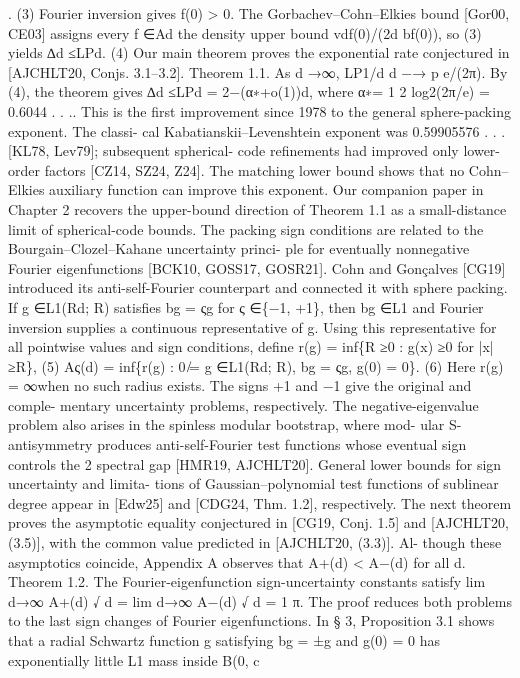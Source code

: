 .
(3)
Fourier inversion gives f(0) > 0. The Gorbachev–Cohn–Elkies bound [Gor00, CE03] assigns
every f ∈Ad the density upper bound vdf(0)/(2d bf(0)), so (3) yields
∆d ≤LPd.
(4)
Our main theorem proves the exponential rate conjectured in [AJCHLT20, Conjs. 3.1–3.2].
Theorem 1.1. As d →∞, LP1/d
d
−→
p
e/(2π).
By (4), the theorem gives ∆d ≤LPd = 2−(α∗+o(1))d, where α∗= 1
2 log2(2π/e) = 0.6044 . . ..
This is the ﬁrst improvement since 1978 to the general sphere-packing exponent. The classi-
cal Kabatianskii–Levenshtein exponent was 0.59905576 . . . [KL78, Lev79]; subsequent spherical-
code reﬁnements had improved only lower-order factors [CZ14, SZ24, Z24]. The matching lower
bound shows that no Cohn–Elkies auxiliary function can improve this exponent.
Our companion paper in Chapter 2 recovers the upper-bound direction of Theorem 1.1 as a
small-distance limit of spherical-code bounds.
The packing sign conditions are related to the Bourgain–Clozel–Kahane uncertainty princi-
ple for eventually nonnegative Fourier eigenfunctions [BCK10, GOSS17, GOSR21]. Cohn and
Gonçalves [CG19] introduced its anti-self-Fourier counterpart and connected it with sphere
packing. If g ∈L1(Rd; R) satisﬁes bg = ςg for ς ∈\{−1, +1\}, then bg ∈L1 and Fourier inversion
supplies a continuous representative of g. Using this representative for all pointwise values and
sign conditions, deﬁne
r(g) = inf\{R ≥0 : g(x) ≥0 for |x| ≥R\},
(5)
Aς(d) = inf\{r(g) : 0 ̸= g ∈L1(Rd; R), bg = ςg, g(0) = 0\}.
(6)
Here r(g) = ∞when no such radius exists. The signs +1 and −1 give the original and comple-
mentary uncertainty problems, respectively.
The negative-eigenvalue problem also arises in the spinless modular bootstrap, where mod-
ular S-antisymmetry produces anti-self-Fourier test functions whose eventual sign controls the
2
spectral gap [HMR19, AJCHLT20].
General lower bounds for sign uncertainty and limita-
tions of Gaussian–polynomial test functions of sublinear degree appear in [Edw25] and [CDG24,
Thm. 1.2], respectively. The next theorem proves the asymptotic equality conjectured in [CG19,
Conj. 1.5] and [AJCHLT20, (3.5)], with the common value predicted in [AJCHLT20, (3.3)]. Al-
though these asymptotics coincide, Appendix A observes that A+(d) < A−(d) for all d.
Theorem 1.2. The Fourier-eigenfunction sign-uncertainty constants satisfy
lim
d→∞
A+(d)
√
d
= lim
d→∞
A−(d)
√
d
= 1
π.
The proof reduces both problems to the last sign changes of Fourier eigenfunctions. In § 3,
Proposition 3.1 shows that a radial Schwartz function g satisfying bg = ±g and g(0) = 0 has
exponentially little L1 mass inside B(0, c
